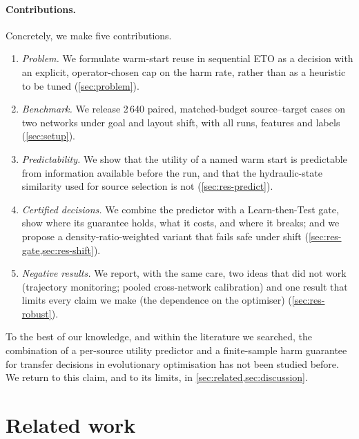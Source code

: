 \documentclass[11pt]{article}
\begin{document}
\paragraph{Contributions.} Concretely, we make five contributions.
\begin{enumerate}[label=(\roman*)]
  \item \emph{Problem.} We formulate warm-start reuse in sequential ETO as a decision with an explicit,
        operator-chosen cap on the harm rate, rather than as a heuristic to be tuned (\cref{sec:problem}).
  \item \emph{Benchmark.} We release 2\,640 paired, matched-budget source--target cases on two networks under goal and
        layout shift, with all runs, features and labels (\cref{sec:setup}).
  \item \emph{Predictability.} We show that the utility of a named warm start is predictable from information
        available before the run, and that the hydraulic-state similarity used for source selection is not
        (\cref{sec:res-predict}).
  \item \emph{Certified decisions.} We combine the predictor with a Learn-then-Test gate, show where its guarantee
        holds, what it costs, and where it breaks; and we propose a density-ratio-weighted variant that fails safe
        under shift (\cref{sec:res-gate,sec:res-shift}).
  \item \emph{Negative results.} We report, with the same care, two ideas that did not work (trajectory monitoring;
        pooled cross-network calibration) and one result that limits every claim we make (the dependence on the
        optimiser) (\cref{sec:res-robust}).
\end{enumerate}
To the best of our knowledge, and within the literature we searched, the combination of a per-source utility
predictor and a finite-sample harm guarantee for transfer decisions in evolutionary optimisation has not been
studied before. We return to this claim, and to its limits, in \cref{sec:related,sec:discussion}.

\section{Related work}\label{sec:related}
\end{document}
